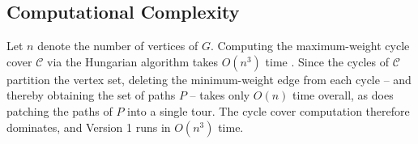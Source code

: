 \subsection{Computational Complexity}
Let $n$ denote the number of vertices of $G$. Computing the maximum-weight cycle
cover $\mathcal{C}$ via the Hungarian algorithm takes $O(n^3)$ time
\cite{kuhn1955hungarian, edmondskarp1972, tomizawa1971techniques}. Since the cycles of $\mathcal{C}$ partition the vertex
set, deleting the minimum-weight edge from each cycle -- and thereby obtaining
the set of paths $P$ -- takes only $O(n)$ time overall, as does patching the
paths of $P$ into a single tour. The cycle cover computation therefore
dominates, and Version 1 runs in $O(n^3)$ time.
